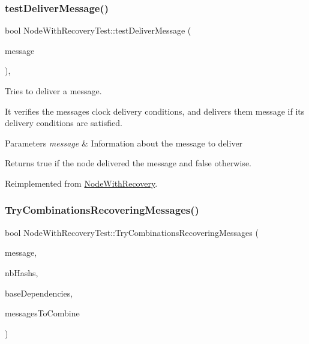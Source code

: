 \subsubsection{\texorpdfstring{test\+Deliver\+Message()}{testDeliverMessage()}}
{\footnotesize\ttfamily bool Node\+With\+Recovery\+Test\+::test\+Deliver\+Message (\begin{DoxyParamCaption}\item[{const \hyperlink{structures_8h_a7e7bdc1d2fff8a9436f2f352b2711ed6}{message\+Info} \&}]{message }\end{DoxyParamCaption})\hspace{0.3cm}{\ttfamily [protected]}, {\ttfamily [virtual]}}



Tries to deliver a message. 

It verifies the message\textquotesingle{}s clock delivery conditions, and delivers them message if its delivery conditions are satisfied. 
\begin{DoxyParams}{Parameters}
{\em message} & Information about the message to deliver \\
\hline
\end{DoxyParams}
\begin{DoxyReturn}{Returns}
true if the node delivered the message and false otherwise. 
\end{DoxyReturn}


Reimplemented from \hyperlink{class_node_with_recovery_aec147b3723b3dab00f9610453ba8daba}{Node\+With\+Recovery}.

\mbox{\label{class_node_with_recovery_test_ae1d2089be117daef7b2ee4dfd6b92e7d}} 
\subsubsection{\texorpdfstring{Try\+Combinations\+Recovering\+Messages()}{TryCombinationsRecoveringMessages()}}
{\footnotesize\ttfamily bool Node\+With\+Recovery\+Test\+::\+Try\+Combinations\+Recovering\+Messages (\begin{DoxyParamCaption}\item[{const \hyperlink{structures_8h_a7e7bdc1d2fff8a9436f2f352b2711ed6}{message\+Info} \&}]{message,  }\item[{unsigned int \&}]{nb\+Hashs,  }\item[{const \hyperlink{class_total_dependencies}{Total\+Dependencies} \&}]{base\+Dependencies,  }\item[{const vector$<$ \hyperlink{structures_8h_a83a1d9a070efa5341da84cfd8e28d3e5}{id\+Msg} $>$ \&}]{messages\+To\+Combine }\end{DoxyParamCaption})\hspace{0.3cm}{\ttfamily [protected]}}

